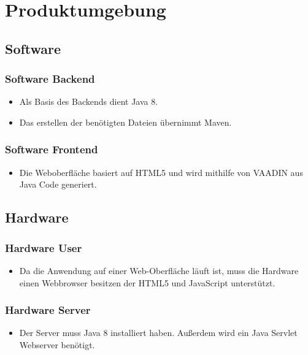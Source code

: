 \section{Produktumgebung}

\subsection{Software}
\subsubsection{Software Backend}
\begin{itemize}
    \item Als Basis des Backends dient Java 8.
    \item Das erstellen der benötigten Dateien übernimmt Maven.
\end{itemize}

\subsubsection{Software Frontend}
\begin{itemize}
    \item Die Weboberfläche basiert auf HTML5 und wird mithilfe von VAADIN aus Java Code generiert.
\end{itemize}

\subsection{Hardware}
\subsubsection{Hardware User}
\begin{itemize}
    \item Da die Anwendung auf einer Web-Oberfläche läuft ist, muss die Hardware einen Webbrowser besitzen der HTML5 und JavaScript unterstützt.
\end{itemize}

\subsubsection{Hardware Server}
\begin{itemize}
    \item  Der Server muss Java 8 installiert haben.
    Außerdem wird ein Java Servlet Webserver benötigt.
\end{itemize}
